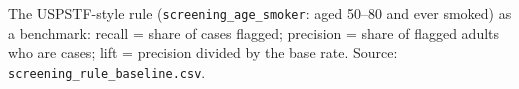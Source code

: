 \begin{table}[htbp]
\centering\small
\caption{The USPSTF-style rule (\texttt{screening\_age\_smoker}: aged 50--80 and ever smoked) as a benchmark: recall = share of cases flagged; precision = share of flagged adults who are cases; lift = precision divided by the base rate. Source: \texttt{screening\_rule\_baseline.csv}.}\label{tab:screening}

\end{table}
